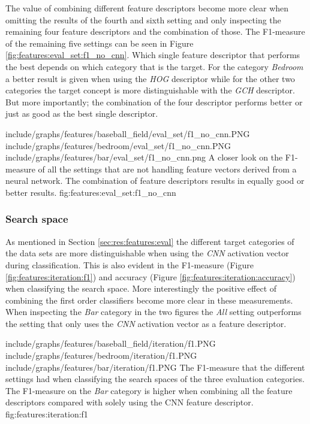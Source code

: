The value of combining different feature descriptors become more clear when omitting the results of the fourth and sixth setting and only inspecting the remaining four feature descriptors and the combination of those. The F1-measure of the remaining five settings can be seen in Figure \ref{fig:features:eval_set:f1_no_cnn}. Which single feature descriptor that performs the best depends on which category that is the target. For the category \emph{Bedroom} a better result is given when using the \emph{HOG} descriptor while for the other two categories the target concept is more distinguishable with the \emph{GCH} descriptor. But more importantly; the combination of the four descriptor performs better or just as good as the best single descriptor. 


\tripfigure
{include/graphs/features/baseball_field/eval_set/f1_no_cnn.PNG}
{include/graphs/features/bedroom/eval_set/f1_no_cnn.PNG}
{include/graphs/features/bar/eval_set/f1_no_cnn.png}
{A closer look on the F1-measure of all the settings that are not handling feature vectors derived from a neural network. The combination of feature descriptors results in equally good or better results.}
{fig:features:eval_set:f1_no_cnn}

\subsubsection{Search space}
\label{sec:res:features:iter}

As mentioned in Section \ref{sec:res:features:eval} the different target categories of the data sets are more distinguishable when using the \emph{CNN} activation vector during classification. This is also evident in the F1-measure (Figure \ref{fig:features:iteration:f1}) and accuracy (Figure \ref{fig:features:iteration:accuracy}) when classifying the search space. More interestingly the positive effect of combining the first order classifiers become more clear in these measurements. When inspecting the \emph{Bar} category in the two figures the \emph{All} setting outperforms the setting that only uses the \emph{CNN} activation vector as a feature descriptor.

\tripfigurenear
{include/graphs/features/baseball_field/iteration/f1.PNG}
{include/graphs/features/bedroom/iteration/f1.PNG}
{include/graphs/features/bar/iteration/f1.PNG}
{The F1-measure that the different settings had when classifying the search spaces of the three evaluation categories. The F1-measure on the \emph{Bar} category is higher when combining all the feature descriptors compared with solely using the CNN feature descriptor.}
{fig:features:iteration:f1}

